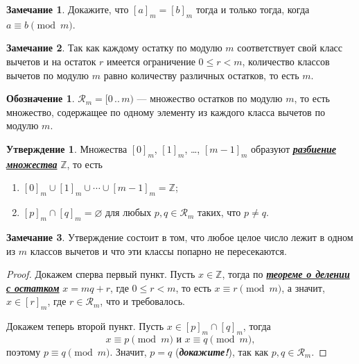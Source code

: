 \documentclass[14pt, a4paper]{extarticle}
\theoremstyle{definition}
\newtheorem*{remark}{Замечание}
\newtheorem*{desig}{Обозначение}
\newtheorem{statement}{Утверждение}
\begin{document}
	\begin{remark}
		Докажите, что $[a]_m=[b]_m$ тогда и только тогда, когда $a\equiv b\pmod{m}$.
	\end{remark}
	
	\begin{remark}
		Так как каждому остатку по модулю $m$ соответствует свой класс вычетов и на остаток $r$ имеется ограничение $0\leqslant r<m$, количество классов вычетов по модулю $m$ равно количеству различных остатков, то есть $m$.
	\end{remark}
	
	\begin{desig}
		$\mathcal{R}_m=[0\,..\,m)$ --- множество остатков по модулю $m$, то есть множество, содержащее по одному элементу из каждого класса вычетов по модулю $m$.
	\end{desig}
	
	\begin{statement}
		Множества $[0]_m$, $[1]_m$, \dots, $[m-1]_m$ образуют \href{https://ru.wikipedia.org/wiki/%D0%A0%D0%B0%D0%B7%D0%B1%D0%B8%D0%B5%D0%BD%D0%B8%D0%B5_%D0%BC%D0%BD%D0%BE%D0%B6%D0%B5%D1%81%D1%82%D0%B2%D0%B0}{\textbf{\textit{разбиение множества}}} $\mathbb{Z}$, то есть
		\begin{enumerate}[topsep=0pt,itemsep=-1ex,partopsep=1ex,parsep=1ex]
			\item $[0]_m\cup[1]_m\cup\cdots\cup[m-1]_m=\mathbb{Z}$;
			\item $[p]_m\cap[q]_m=\varnothing$ для любых $p,q\in\mathcal{R}_m$ таких, что $p\neq q$.
		\end{enumerate}
	\end{statement}
	\begin{remark}
		Утверждение состоит в том, что любое целое число лежит в одном из $m$ классов вычетов и что эти классы попарно не пересекаются.
	\end{remark}
	\begin{proof}
		Докажем сперва первый пункт. Пусть $x\in\mathbb{Z}$, тогда по \hyperref[ost]{\textbf{\textit{теореме о делении с остатком}}} $x=mq+r$, где $0\leqslant r<m$, то есть $x\equiv r\pmod{m}$, а значит, $x\in[r]_m$, где $r\in\mathcal{R}_m$, что и требовалось.
		
		Докажем теперь второй пункт. Пусть $x\in[p]_m\cap[q]_m$, тогда $$x\equiv p\pmod{m}\text{ и }x\equiv q\pmod{m},$$ поэтому $p\equiv q\pmod{m}$. Значит, $p=q$ (\textbf{\textit{докажите!}}), так как \mbox{$p,q\in\mathcal{R}_m$}.
	\end{proof}
\end{document}
